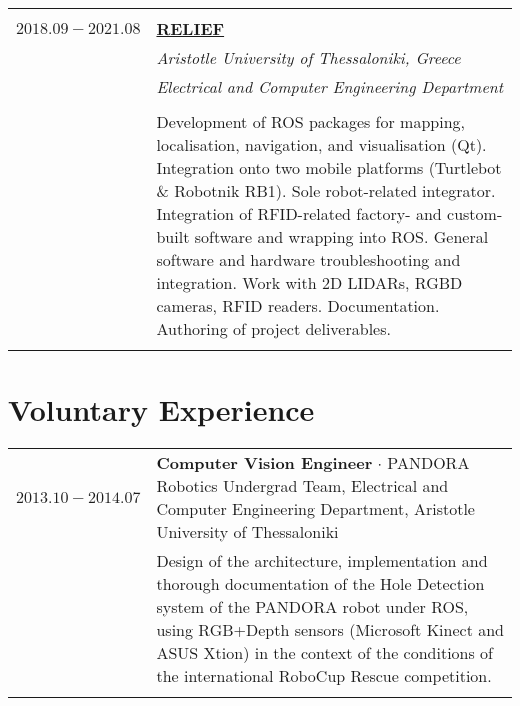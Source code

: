 \documentclass[a4paper,10pt,twoside]{article}
\begin{document}
\begin{tabular}{rp{11cm}}
&\\
$2018.09 - 2021.08$ & \href{https://relief.web.auth.gr/}{\textbf{RELIEF}} \\
                    & \textit{Aristotle University of Thessaloniki, Greece}\\
                    & \textit{Electrical and Computer Engineering Department} \\
\\
                    & Development of ROS packages for mapping, localisation, navigation, and visualisation (Qt). Integration onto two mobile platforms (Turtlebot \& Robotnik RB1). Sole robot-related integrator. Integration of RFID-related factory- and custom-built software and wrapping into ROS. General software and hardware troubleshooting and integration. Work with 2D LIDARs, RGBD cameras, RFID readers. Documentation. Authoring of project deliverables.\\
&\\
\end{tabular}


\section{Voluntary Experience}

\begin{tabular}{rp{11cm}}
  $2013.10 -2014.07$ & \textbf{Computer Vision Engineer} $\cdot$ PANDORA Robotics Undergrad Team,
Electrical and Computer Engineering Department, Aristotle University of Thessaloniki\\
& \small{Design of the architecture, implementation and thorough documentation of
the Hole Detection system of the PANDORA robot under ROS, using RGB+Depth sensors
(Microsoft Kinect and ASUS Xtion) in the context of the conditions of the international
RoboCup Rescue competition.}\\
\multicolumn{2}{c}{} \\
\end{tabular}

\vspace*{\fill}
\newpage

\end{document}
